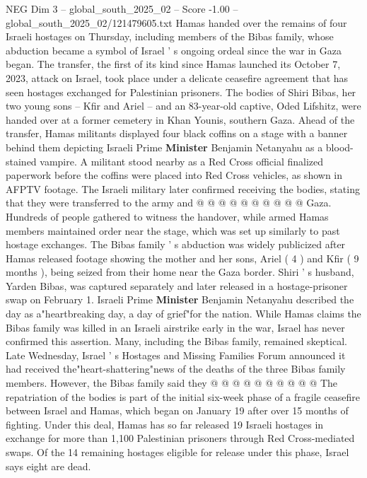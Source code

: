 \begin{textsample}{NEG Dim 3 – global\_south\_2025\_02 – Score -1.00 – global\_south\_2025\_02/121479605.txt}  \label{ex:f3_neg_008}
Hamas handed over the remains of four Israeli hostages on Thursday, including members of the Bibas family, whose abduction became a symbol of Israel ' s ongoing ordeal since the war in Gaza began.
The transfer, the first of its kind since Hamas launched its October 7, 2023, attack on Israel, took place under a delicate ceasefire agreement that has seen hostages exchanged for Palestinian prisoners.
The bodies of Shiri Bibas, her two young sons -- Kfir and Ariel -- and an 83-year-old captive, Oded Lifshitz, were handed over at a former cemetery in Khan Younis, southern Gaza.
Ahead of the transfer, Hamas militants displayed four black coffins on a stage with a banner behind them depicting Israeli Prime \textbf{Minister} Benjamin Netanyahu as a blood-stained vampire.
A militant stood nearby as a Red Cross official finalized paperwork before the coffins were placed into Red Cross vehicles, as shown in AFPTV footage.
The Israeli military later confirmed receiving the bodies, stating that they were transferred to the army and @ @ @ @ @ @ @ @ @ @ Gaza.
Hundreds of people gathered to witness the handover, while armed Hamas members maintained order near the stage, which was set up similarly to past hostage exchanges.
The Bibas family ' s abduction was widely publicized after Hamas released footage showing the mother and her sons, Ariel ( 4 ) and Kfir ( 9 months ), being seized from their home near the Gaza border.
Shiri ' s husband, Yarden Bibas, was captured separately and later released in a hostage-prisoner swap on February 1.
Israeli Prime \textbf{Minister} Benjamin Netanyahu described the day as a"heartbreaking day, a day of grief"for the nation.
While Hamas claims the Bibas family was killed in an Israeli airstrike early in the war, Israel has never confirmed this assertion.
Many, including the Bibas family, remained skeptical.
Late Wednesday, Israel ' s Hostages and Missing Families Forum announced it had received the"heart-shattering"news of the deaths of the three Bibas family members.
However, the Bibas family said they @ @ @ @ @ @ @ @ @ @ The repatriation of the bodies is part of the initial six-week phase of a fragile ceasefire between Israel and Hamas, which began on January 19 after over 15 months of fighting.
Under this deal, Hamas has so far released 19 Israeli hostages in exchange for more than 1,100 Palestinian prisoners through Red Cross-mediated swaps.
Of the 14 remaining hostages eligible for release under this phase, Israel says eight are dead.

\end{textsample}
